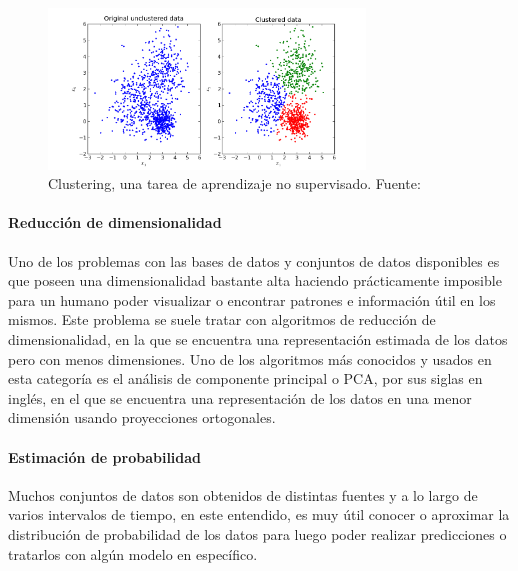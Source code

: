             \begin{figure}[!h] 
                \centering
                \includegraphics[width=0.75\textwidth]{img/clustering}
                \caption[Clustering]{Clustering, una tarea de aprendizaje no supervisado. Fuente: \cite{viswarupan_2017} }
                \label{fig:clustering}
            \end{figure}

            \paragraph{Reducción de dimensionalidad}
            Uno de los problemas con las bases de datos y conjuntos de datos disponibles es que poseen una dimensionalidad 
            bastante alta haciendo prácticamente imposible para un humano poder visualizar o encontrar patrones e información 
            útil en los mismos. Este problema se suele tratar con algoritmos de reducción de dimensionalidad, en la que 
            se encuentra una representación estimada de los datos pero con menos dimensiones. Uno de los algoritmos más 
            conocidos y usados en esta categoría es el análisis de componente principal o PCA, por sus siglas en inglés, en el 
            que se encuentra una representación de los datos en una menor dimensión usando proyecciones ortogonales.

            \paragraph{Estimación de probabilidad}
            Muchos conjuntos de datos son obtenidos de distintas fuentes y a lo largo de varios intervalos de tiempo, en este 
            entendido, es muy útil conocer o aproximar la distribución de probabilidad de los datos para luego poder realizar 
            predicciones o tratarlos con algún modelo en específico.

